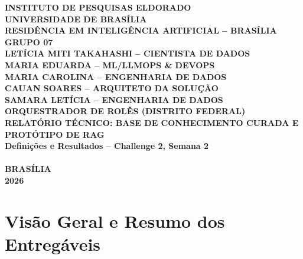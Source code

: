 \documentclass[11pt,a4paper]{article}
\begin{document}
\begin{titlepage}
\begin{center}
{\bfseries INSTITUTO DE PESQUISAS ELDORADO\\
UNIVERSIDADE DE BRASÍLIA\\
RESIDÊNCIA EM INTELIGÊNCIA ARTIFICIAL -- BRASÍLIA\\[2.8cm]

GRUPO 07\\[0.35cm]
LETÍCIA MITI TAKAHASHI -- CIENTISTA DE DADOS\\
MARIA EDUARDA -- ML/LLMOPS \& DEVOPS\\
MARIA CAROLINA -- ENGENHARIA DE DADOS\\
CAUAN SOARES -- ARQUITETO DA SOLUÇÃO\\
SAMARA LETÍCIA -- ENGENHARIA DE DADOS\\[3.0cm]

ORQUESTRADOR DE ROLÊS (DISTRITO FEDERAL)\\[0.3cm]
{\normalsize RELATÓRIO TÉCNICO: BASE DE CONHECIMENTO CURADA E PROTÓTIPO DE RAG\\
Definições e Resultados -- Challenge 2, Semana 2}\\[1.2cm]

\\[2.8cm]

BRASÍLIA\\
2026}
\end{center}
\end{titlepage}

\setcounter{page}{1}

\section{Visão Geral e Resumo dos Entregáveis}
\end{document}
